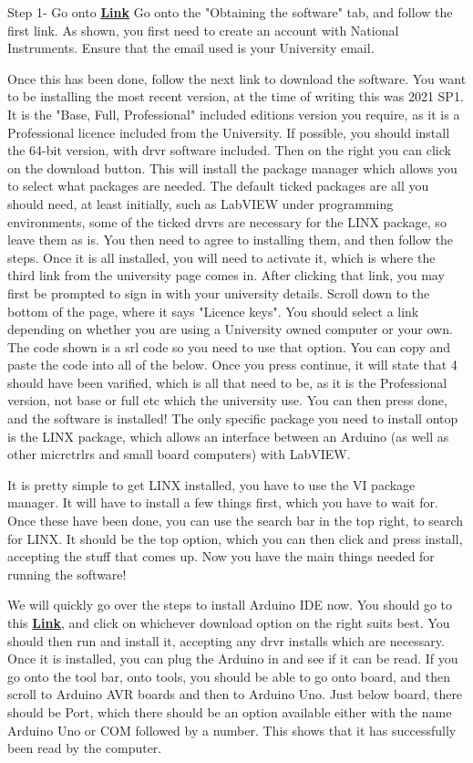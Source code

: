 \documentclass[a4paper,11pt]{report}
\let\oldhref\href %
\renewcommand{\href}[2]{\oldhref{#1}{\bfseries#2}}
\begin{document}
Step 1- Go onto \href{https://www.york.ac.uk/it-services/software/a-z/labview/}{Link}
Go onto the "Obtaining the software" tab, and follow the first link. As shown, you first need to create an account with National Instruments. Ensure that the email used is your University email.

Once this has been done, follow the next link to download the software. You want to be installing the most recent version, at the time of writing this was 2021 SP1. It is the "Base, Full, Professional" included editions version you require, as it is a Professional licence included from the University. If possible, you should install the 64-bit version, with \gls{drvr} software included. Then on the right you can click on the download button. This will install the package manager which allows you to select what packages are needed. The default ticked packages are all you should need, at least initially, such as LabVIEW under programming environments, some of the ticked \gls{drvr}s are necessary for the LINX package, so leave them as is. You then need to agree to installing them, and then follow the steps. Once it is all installed, you will need to activate it, which is where the third link from the university page comes in. After clicking that link, you may first be prompted to sign in with your university details. Scroll down to the bottom of the page, where it says "Licence keys". You should select a link depending on whether you are using a University owned computer or your own. The code shown is a \gls{srl} code so you need to use that option. You can copy and paste the code into all of the below. Once you press continue, it will state that 4 should have been varified, which is all that need to be, as it is the Professional version, not base or full etc which the university use. You can then press done, and the software is installed! The only specific package you need to install ontop is the LINX package, which allows an interface between an Arduino (as well as other \gls{micrctrlr}s and small board computers) with LabVIEW.

It is pretty simple to get LINX installed, you have to use the VI package manager. It will have to install a few things first, which you have to wait for. Once these have been done, you can use the search bar in the top right, to search for LINX. It should be the top option, which you can then click and press install, accepting the stuff that comes up. Now you have the main things needed for running the software!

We will quickly go over the steps to install Arduino IDE now. You should go to this \href{https://www.arduino.cc/en/software}{Link}, and click on whichever download option on the right suits best. You should then run and install it, accepting any \gls{drvr} installs which are necessary. Once it is installed, you can plug the Arduino in and see if it can be read. If you go onto the tool bar, onto tools, you should be able to go onto board, and then scroll to Arduino AVR boards and then to Arduino Uno. Just below board, there should be Port, which there should be an option available either with the name Arduino Uno or COM followed by a number. This shows that it has successfully been read by the computer.
\end{document}
